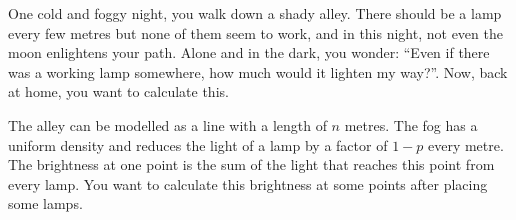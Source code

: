 

%
One cold and foggy night, you walk down a shady alley.
There should be a lamp every few metres but none of them seem to work, and in this night, not even the moon enlightens your path.
Alone and in the dark, you wonder:
``Even if there was a working lamp somewhere, how much would it lighten my way?''.
Now, back at home, you want to calculate this.

The alley can be modelled as a line with a length of $n$ metres.
The fog has a uniform density and reduces the light of a lamp by a factor of $1-p$ every metre.
The brightness at one point is the sum of the light that reaches this point from every lamp.
You want to calculate this brightness at some points after placing some lamps.

